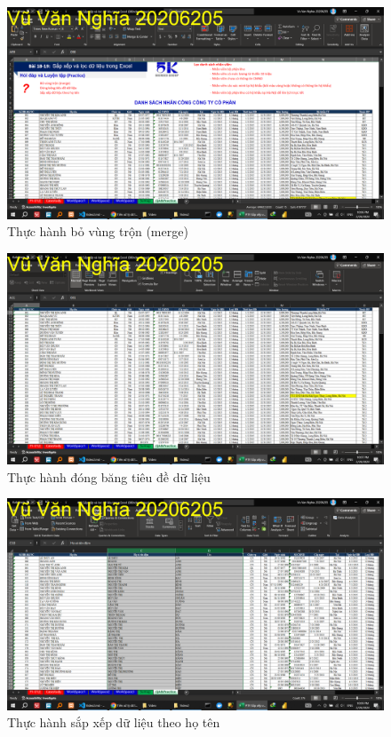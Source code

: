 \documentclass{article}
\begin{document}
\begin{figure}[h]
\centering
\includegraphics[scale = 0.15]{Video2/ThucHanh/0.png}
\caption{Thực hành bỏ vùng trộn (merge)}
\end{figure}

\begin{figure}[h]
\centering
\includegraphics[scale = 0.15]{Video2/ThucHanh/1.png}
\caption{Thực hành đóng băng tiêu đề dữ liệu}
\end{figure}

\begin{figure}[h]
\centering
\includegraphics[scale = 0.15]{Video2/ThucHanh/2.png}
\caption{Thực hành sắp xếp dữ liệu theo họ tên}
\end{figure}
\end{document}
